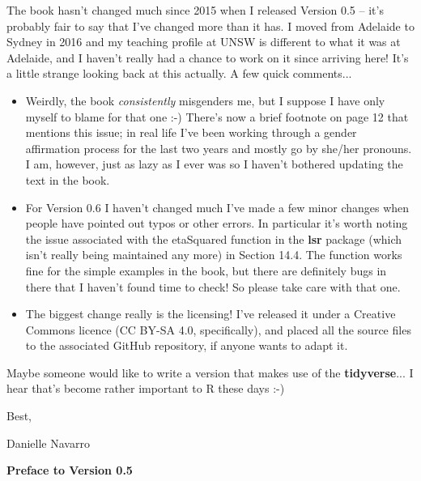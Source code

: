 \noindent
The book hasn't changed much since 2015 when I released Version 0.5 -- it's probably fair to say that I've changed more than it has. I moved from Adelaide to Sydney in 2016 and my teaching profile at UNSW is different to what it was at Adelaide, and I haven't really had a chance to work on it since arriving here! It's a little strange looking back at this actually. A few quick comments...

\begin{itemize}
\item Weirdly, the book {\it consistently} misgenders me, but I suppose I have only myself to blame for that one :-) There's now a brief footnote on page 12 that mentions this issue; in real life I've been working through a gender affirmation process for the last two years and mostly go by she/her pronouns. I am, however, just as lazy as I ever was so I haven't bothered updating the text in the book.  
\item For Version 0.6 I haven't changed much I've made a few minor changes when people have pointed out typos or other errors. In particular it's worth noting the issue associated with the etaSquared function in the {\bf lsr} package (which isn't really being maintained any more) in Section 14.4. The function works fine for the simple examples in the book, but there are definitely bugs in there that I haven't found time to check! So please take care with that one. 
\item The biggest change really is the licensing! I've released it under a Creative Commons licence (CC BY-SA 4.0, specifically), and placed all the source files to the associated GitHub repository, if anyone wants to adapt it.
\end{itemize} 

\noindent
Maybe someone would like to write a version that makes use of the {\bf tidyverse}... I hear that's become rather important to R these days :-)

\vspace*{24pt}
\noindent
Best,

\noindent
Danielle Navarro

 
\vspace*{30pt}

\begin{center}{\Large {\bf Preface to Version 0.5}}\end{center}
\vspace*{12pt}

